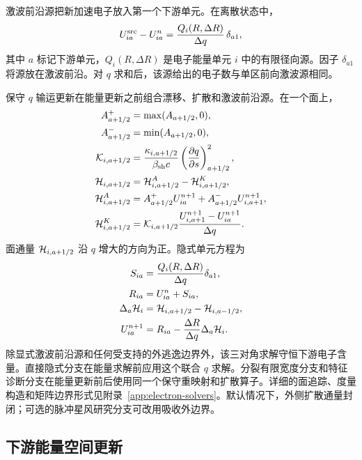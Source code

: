 \documentclass[twocolumn]{aastex702}
\begin{document}
激波前沿源把新加速电子放入第一个下游单元。在离散状态中，
\begin{equation}
U_{ia}^{\rm src}-U_{ia}^{n}
=\frac{Q_i(R,\Delta R)}{\Delta q}\,\delta_{a1},
\end{equation}
其中 \(a\) 标记下游单元，\(Q_i(R,\Delta R)\) 是电子能量单元 \(i\) 中的有限径向源。因子 \(\delta_{a1}\) 将源放在激波前沿。对 \(q\) 求和后，该源给出的电子数与单区前向激波源相同。

保守 \(q\) 输运更新在能量更新之前组合漂移、扩散和激波前沿源。在一个面上，
\begin{equation}
\begin{aligned}
A_{a+1/2}^{+}&=\max(A_{a+1/2},0),\\
A_{a+1/2}^{-}&=\min(A_{a+1/2},0),\\
{\cal K}_{i,a+1/2}
&=\frac{\kappa_{i,a+1/2}}{\beta_{\rm sh}c}
\left(\frac{\partial q}{\partial s}\right)^2_{a+1/2},\\
{\cal H}_{i,a+1/2}
&={\cal H}^{A}_{i,a+1/2}-{\cal H}^{K}_{i,a+1/2},\\
{\cal H}^{A}_{i,a+1/2}
&=A_{a+1/2}^{+}U_{ia}^{n+1}
+A_{a+1/2}^{-}U_{i,a+1}^{n+1},\\
{\cal H}^{K}_{i,a+1/2}
&={\cal K}_{i,a+1/2}
\frac{U_{i,a+1}^{n+1}-U_{ia}^{n+1}}{\Delta q}.
\end{aligned}
\end{equation}
面通量 \({\cal H}_{i,a+1/2}\) 沿 \(q\) 增大的方向为正。隐式单元方程为
\begin{equation}
\begin{aligned}
S_{ia}&=\frac{Q_i(R,\Delta R)}{\Delta q}\delta_{a1},\\
R_{ia}&=U_{ia}^{n}+S_{ia},\\
\Delta_a{\cal H}_i
&={\cal H}_{i,a+1/2}-{\cal H}_{i,a-1/2},\\
U_{ia}^{n+1}
&=R_{ia}-\frac{\Delta R}{\Delta q}\Delta_a{\cal H}_i .
\end{aligned}
\end{equation}
除显式激波前沿源和任何受支持的外逃逸边界外，该三对角求解守恒下游电子含量。直接隐式分支在能量求解前应用这个联合 \(q\) 求解。分裂有限宽度分支和特征诊断分支在能量更新前后使用同一个保守重映射和扩散算子。详细的面追踪、度量构造和矩阵边界形式见附录~\ref{app:electron-solvers}。默认情况下，外侧扩散通量封闭；可选的脉冲星风研究分支可改用吸收外边界。

\subsection{下游能量空间更新}
\end{document}
